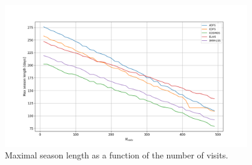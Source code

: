 \documentclass[\docopts]{\docclass}
\begin{document}
\begin{figure}[htbp]
\begin{center}
  \includegraphics[width=0.95\textwidth]{seasonlength_nvisits.png}
 \caption{Maximal season length as a function of the number of visits.}\label{fig:seasonlength_nvisits}
\end{center}
\end{figure}
\end{document}
